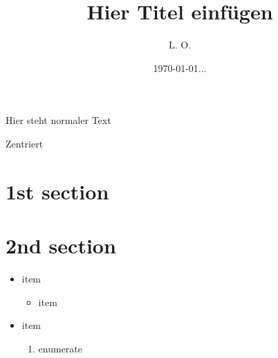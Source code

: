\documentclass[12pt]{scrartcl}
\title{Hier Titel einfügen}
\author{L. O.}
\date{\today{}...}
\begin{document}
\maketitle
\tableofcontents 	%
\newpage	%
Hier steht normaler Text
\begin{center}
Zentriert
\end{center}
\section{1st section}	%
\section{2nd section} %
\label{sec:2nd-section} %

\begin{itemize} %
\item item
\begin{itemize}
\item item
\end{itemize}
\item item
\begin{enumerate}	%
\item enumerate
\end{enumerate}
\end{itemize}
\end{document}

